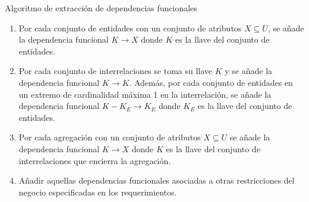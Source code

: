 \begin{frame}{Algoritmo de extracci\'on de dependencias funcionales}
    \begin{enumerate}
        \item<2-> Por cada conjunto de entidades con un conjunto de atributos $X \subseteq U$,
        se a\~nade la dependencia funcional $K \to X$ donde $K$ es la llave del conjunto de entidades.
        \item<3-> Por cada conjunto de interrelaciones se toma su llave $K$ y se a\~nade la
        dependencia funcional $K \to K$. Adem\'as, por cada conjunto de entidades en un extremo
        de cardinalidad m\'axima 1 en la interrelaci\'on, se a\~nade la dependencia funcional $K - K_E \to K_E$ donde
        $K_E$ es la llave del conjunto de entidades.
        \item<4-> Por cada agregaci\'on con un conjunto de atributos $X \subseteq U$ se a\~nade la dependencia
        funcional $K \to X$ donde $K$ es la llave del conjunto de interrelaciones que encierra la agregaci\'on.
        \item<5-> A\~nadir aquellas dependencias funcionales asociadas a otras restricciones del negocio
        especificadas en los requerimientos.
    \end{enumerate}
        
\end{frame}


